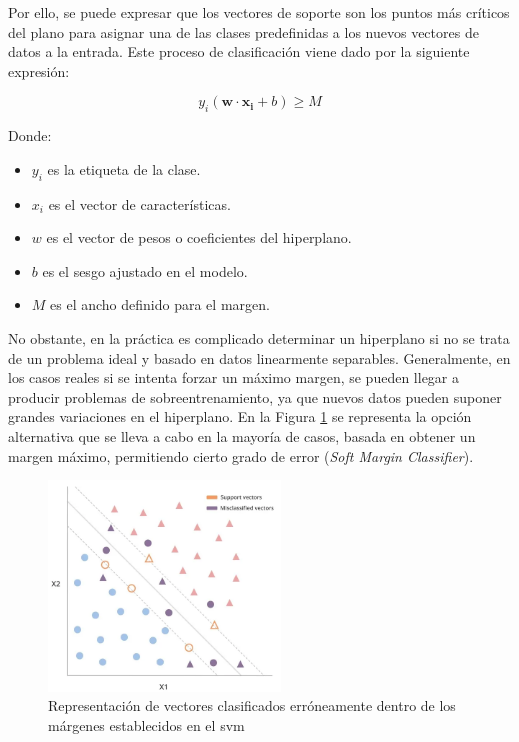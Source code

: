 \vspace{3mm}

Por ello, se puede expresar que los vectores de soporte son los puntos más críticos del plano para asignar una de las clases predefinidas a los nuevos vectores de datos a la entrada. Este proceso de clasificación viene dado por la siguiente expresión: \cite{svmmedium} 

\[ y_i(\mathbf{w} \cdot \mathbf{x_i} + b) \geq M\]

    Donde:
\begin{itemize}
    \renewcommand{\labelitemi}{}
    \item \(y_i\) es la etiqueta de la clase. 
    \item \(x_i\) es el vector de características.
    \item \(w\) es el vector de pesos o coeficientes del hiperplano.
    \item \(b\) es el sesgo ajustado en el modelo.
    \item \(M\) es el ancho definido para el margen.
\end{itemize}

\vspace{3mm}

No obstante, en la práctica es complicado determinar un hiperplano si no se trata de un problema ideal y basado en datos linearmente separables. Generalmente, en los casos reales si se intenta forzar un máximo margen, se pueden llegar a producir problemas de sobreentrenamiento, ya que nuevos datos pueden suponer grandes variaciones en el hiperplano. En la Figura \ref{fig:svmerror} se representa la opción alternativa que se lleva a cabo en la mayoría de casos, basada en obtener un margen máximo, permitiendo cierto grado de error (\textit{Soft Margin Classifier}). \cite{matlab} \cite{svmciencia}

\vspace{3mm}

\begin{figure}[h!]
    \centering
    \includegraphics[width=0.55\textwidth]{img/teoria/svm2.png}
    \caption{Representación de vectores clasificados erróneamente dentro de los márgenes establecidos en el \acrshort{svm} \cite{svmmedium}}
    \label{fig:svmerror}
\end{figure}

